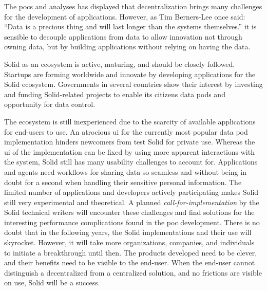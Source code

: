The \glspl{poc} and analyses has displayed that decentralization brings many challenges for the development of applications. However, as Tim Berners-Lee once said: “Data is a precious thing and will last longer than the systems themselves.” it is sensible to decouple applications from data to allow innovation not through owning data, but by building applications without relying on having the data.

\vspace{0.5cm}

Solid as an ecosystem is active, maturing, and should be closely followed. Startups are forming worldwide and innovate by developing applications for the Solid ecosystem. Governments in several countries show their interest by investing and funding Solid-related projects to enable its citizens data pods and opportunity for data control. 

The ecosystem is still inexperienced due to the scarcity of available applications for end-users to use. An atrocious \gls{ui} for the currently most popular data pod implementation hinders newcomers from test Solid for private use. Whereas the \gls{ui} of the implementation can be fixed by using more apparent interactions with the system, Solid still has many usability challenges to account for. Applications and agents need workflows for sharing data so seamless and without being in doubt for a second when handling their sensitive personal information. The limited number of applications and developers actively participating makes Solid still very experimental and theoretical. A planned \textit{call-for-implementation} by the Solid technical writers will encounter these challenges and find solutions for the interesting performance complications found in the \gls{poc} development. There is no doubt that in the following years, the Solid implementations and their use will skyrocket. However, it will take more organizations, companies, and individuals to initiate a breakthrough until then. The products developed need to be clever, and their benefits need to be visible to the end-user. When the end-user cannot distinguish a decentralized from a centralized solution, and no frictions are visible on use, Solid will be a success.



